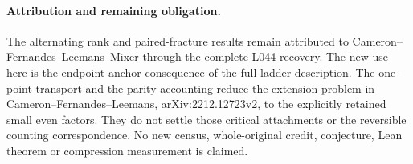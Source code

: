 \documentclass[11pt,a4paper]{article}
\begin{document}
\paragraph{Attribution and remaining obligation.}
The alternating rank and paired-fracture results remain attributed
to Cameron--Fernandes--Leemans--Mixer through the complete L044
recovery. The new use here is the endpoint-anchor consequence of
the full ladder description. The one-point transport and the
parity accounting reduce the extension problem in
Cameron--Fernandes--Leemans, arXiv:2212.12723v2, to the explicitly
retained small even factors. They do not settle those critical
attachments or the reversible counting correspondence. No new
census, whole-original credit, conjecture, Lean theorem or compression
measurement is claimed.
\end{document}
